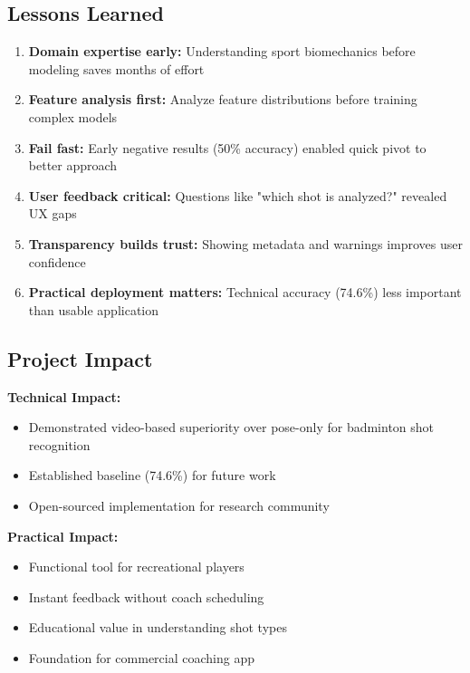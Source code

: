 \documentclass[12pt,a4paper]{article}
\begin{document}
\subsection{Lessons Learned}

\begin{enumerate}
\item \textbf{Domain expertise early:} Understanding sport biomechanics before modeling saves months of effort

\item \textbf{Feature analysis first:} Analyze feature distributions before training complex models

\item \textbf{Fail fast:} Early negative results (50\% accuracy) enabled quick pivot to better approach

\item \textbf{User feedback critical:} Questions like "which shot is analyzed?" revealed UX gaps

\item \textbf{Transparency builds trust:} Showing metadata and warnings improves user confidence

\item \textbf{Practical deployment matters:} Technical accuracy (74.6\%) less important than usable application
\end{enumerate}

\subsection{Project Impact}

\textbf{Technical Impact:}
\begin{itemize}
\item Demonstrated video-based superiority over pose-only for badminton shot recognition
\item Established baseline (74.6\%) for future work
\item Open-sourced implementation for research community
\end{itemize}

\textbf{Practical Impact:}
\begin{itemize}
\item Functional tool for recreational players
\item Instant feedback without coach scheduling
\item Educational value in understanding shot types
\item Foundation for commercial coaching app
\end{itemize}
\end{document}

